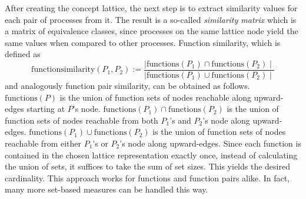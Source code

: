 \documentclass[a4paper, final, diplominf]{zih-template}
\begin{document}
After creating the concept lattice, the next step is to extract similarity values for each pair of processes from it.
The result is a so-called \emph{similarity matrix} which is a matrix of equivalence classes, since processes on the same lattice node yield the same values when compared to other processes.
Function similarity, which is defined as
\vspace{0.5ex}
\begin{equation*}
	\text{functionsimilarity}(P_1, P_2) := \frac{ \mid \text{functions}(P_1) \cap \text{functions}(P_2) \mid }{ \mid \text{functions}(P_1) \cup \text{functions}(P_2) \mid }
\end{equation*}
and analogously function pair similarity, can be obtained as follows.
$\text{functions}(P)$ is the union of function sets of nodes reachable along upward-edges starting at $P$'s node.
$\text{functions}(P_1) \cap \text{functions}(P_2)$ is the union of function sets of nodes reachable from both $P_1$'s and $P_2$'s node along upward-edges.
$\text{functions}(P_1) \cup \text{functions}(P_2)$ is the union of function sets of nodes reachable from either $P_1$'s or $P_2$'s node along upward-edges.
Since each function is contained in the chosen lattice representation exactly once, instead of calculating the union of sets, it suffices to take the sum of set sizes.
This yields the desired cardinality.
This approach works for functions and function pairs alike.
In fact, many more set-based measures can be handled this way.
\end{document}

